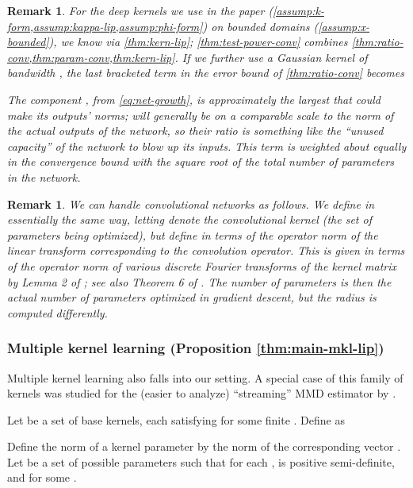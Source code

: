 \documentclass{article}
\newtheorem{remark}[theorem]{Remark}  \crefname{remark}{Remark}{Remarks}
\begin{document}
\begin{remark}
For the deep kernels we use in the paper (\cref{assump:k-form,assump:kappa-lip,assump:phi-form}) on bounded domains (\cref{assump:x-bounded}),
we know  via \cref{thm:kern-lip};
\cref{thm:test-power-conv} combines \cref{thm:ratio-conv,thm:param-conv,thm:kern-lip}.
If we further use a Gaussian kernel  of bandwidth ,
the last bracketed term in the error bound of \cref{thm:ratio-conv} becomes

The component , from \eqref{eq:net-growth},
is approximately the largest that  could make its outputs' norms;
 will generally be on a comparable scale to the norm of the actual outputs of the network,
so their ratio is something like the ``unused capacity'' of the network to blow up its inputs.
This term is weighted about equally in the convergence bound with the square root of the total number of parameters in the network.
\end{remark}

\begin{remark} \label{remark:convnets}
We can handle convolutional networks as follows.
We define  in essentially the same way,
letting  denote the convolutional kernel
(the set of parameters being optimized),
but define  in terms of the operator norm of the linear transform corresponding to the convolution operator.
This is given in terms of the operator norm
of various discrete Fourier transforms of the kernel matrix
by Lemma 2 of \citet{Bibi2019};
see also Theorem 6 of \citet{sedghi:conv-svs}.
The number of parameters  is then the actual number of parameters optimized in gradient descent,
but the radius  is computed differently.\end{remark}


\subsubsection{Multiple kernel learning (Proposition \ref{thm:main-mkl-lip})} \label{sec:proof:mkl}

Multiple kernel learning \citep{Gonen:mkl} also falls into our setting.
A special case of this family of kernels was studied for the (easier to analyze) ``streaming'' MMD estimator by \citet{Gretton2012NeurIPS}.

\begin{netassumplist}[resume]
    \item \label{assump:mkl}
      Let  be a set of base kernels,
      each satisfying  for some finite .
      Define  as
      
      Define the norm of a kernel parameter by the norm of the corresponding vector .
      Let  be a set of possible parameters such that for each ,  is positive semi-definite, and  for some .
\end{netassumplist}
\end{document}

